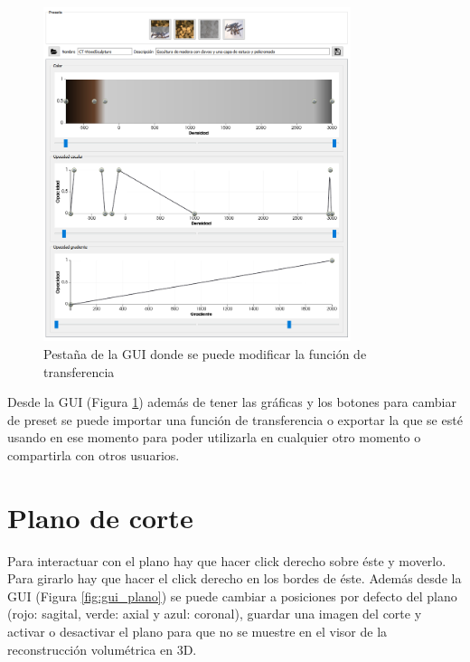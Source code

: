 \begin{figure}[H]
	\centering
	\includegraphics[width=9cm]{imagenes/pestana_funcion_de_transferencia}
	\caption{Pestaña de la GUI donde se puede modificar la función de transferencia}
	\label{fig:pestana_funcion_de_transferencia}
\end{figure}

Desde la GUI (Figura \ref{fig:pestana_funcion_de_transferencia}) además de tener las gráficas y los botones para cambiar de preset se puede importar una función de transferencia o exportar la que se esté usando en ese momento para poder utilizarla en cualquier otro momento o compartirla con otros usuarios.

\section{Plano de corte}

Para interactuar con el plano hay que hacer click derecho sobre éste y moverlo. Para girarlo hay que hacer el click derecho en los bordes de éste. Además desde la GUI (Figura \ref{fig:gui_plano}) se puede cambiar a posiciones por defecto del plano (rojo: sagital, verde: axial y azul: coronal), guardar una imagen del corte y activar o desactivar el plano para que no se muestre en el visor de la reconstrucción volumétrica en 3D.

